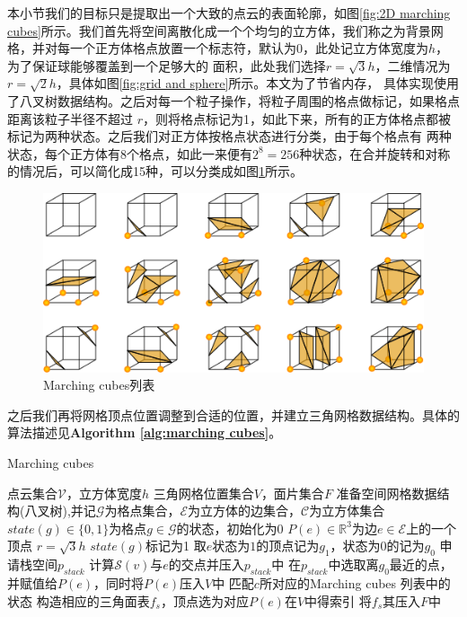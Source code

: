 本小节我们的目标只是提取出一个大致的点云的表面轮廓，如图\ref{fig:2D marching cubes}所示。我们首先将空间离散化成一个个均匀的立方体，我们称之为背景网格，并对每一个正方体格点放置一个标志符，默认为0，此处记立方体宽度为$h$，为了保证球能够覆盖到一个足够大的
面积，此处我们选择$r = \sqrt{3}h$，二维情况为$r = \sqrt{2}h$，具体如图\ref{fig:grid and sphere}所示。本文为了节省内存，
具体实现使用了八叉树数据结构。之后对每一个粒子操作，将粒子周围的格点做标记，如果格点距离该粒子半径不超过
$r$，则将格点标记为1，如此下来，所有的正方体格点都被标记为两种状态。之后我们对正方体按格点状态进行分类，由于每个格点有
两种状态，每个正方体有8个格点，如此一来便有$2^8 = 256$种状态，在合并旋转和对称的情况后，可以简化成15种，可以分类成如图\ref{fig:marching cubes table}所示。
\begin{figure}[htbp]
    \centering
    \includegraphics[scale=0.6]{./images/image6.png}
    \caption{Marching cubes列表}
    \label{fig:marching cubes table}
\end{figure}
之后我们再将网格顶点位置调整到合适的位置，并建立三角网格数据结构。具体的算法描述见\textbf{Algorithm \ref{alg:marching cubes}}。
\begin{algorithm}
    \caption{Marching cubes}
    \label{alg:marching cubes}
    \begin{algorithmic}[1]
    \Require 点云集合$\mathcal{V}$，立方体宽度$h$
    \Ensure 三角网格位置集合$V$，面片集合$F$
    \State 准备空间网格数据结构(八叉树),并记$\mathcal{G}$为格点集合，$\mathcal{E}$为立方体的边集合，$\mathcal{C}$为立方体集合
    \State $state(g)\in \{0,1\}$为格点$g\in \mathcal{G}$的状态，初始化为0
    \State $P(e)\in \mathbb{R}^3$为边$e\in \mathcal{E}$上的一个顶点
    \State $r = \sqrt{3}h$
            \State $state(g)$标记为1    
        \EndFor
    \EndFor    
      \State  取$e$状态为$1$的顶点记为$g_1$，状态为$0$的记为$g_0$
      \State 申请栈空间$p_{stack}$
        \State 计算$\mathcal{S}(v)$与$e$的交点并压入$p_{stack}$中
      \EndFor
      \State 在$p_{stack}$中选取离$g_0$最近的点，并赋值给$P(e)$，同时将$P(e)$压入$V$中
    \EndFor
        \State 匹配$c$所对应的Marching cubes 列表中的状态
        \State 构造相应的三角面表$f_s$，顶点选为对应$P(e)$在$V$中得索引
        \State 将$f_s$其压入$F$中
    \EndFor
    \end{algorithmic}
\end{algorithm}

